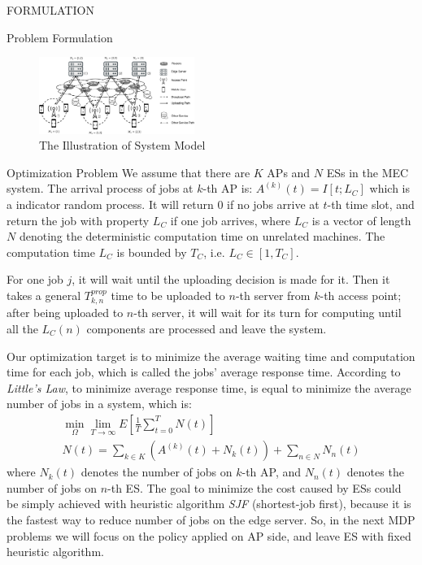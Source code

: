\documentclass[10pt, conference, letterpaper]{IEEEtran}
\begin{document}
\begin{section}{FORMULATION}
\begin{subsection}{Problem Formulation}
            \begin{figure}[h]
                \centering
                \includegraphics[width=0.45\textwidth, trim={0.5cm 0.5cm 0.5cm 0.5cm}, clip]{system-model.pdf}
                \caption{The Illustration of System Model}
                \label{fig:system}
            \end{figure}

            \begin{subsubsection}{Optimization Problem}
                We assume that there are $K$ APs and $N$ ESs in the MEC system.
                The arrival process of jobs at $k$-th AP is: $A^{(k)}(t)=I[t; L_C]$ which is a indicator random process. It will return $0$ if no jobs arrive at $t$-th time slot, and return the job with property $L_C$ if one job arrives, where $L_C$ is a vector of length $N$ denoting the deterministic computation time on unrelated machines.
                The computation time $L_C$ is bounded by $T_C$, i.e. $L_C \in [1,T_C]$.
                
                For one job $j$, it will wait until the uploading decision is made for it. Then it takes a general $T^{prop}_{k,n}$ time to be uploaded to $n$-th server from $k$-th access point; after being uploaded to $n$-th server, it will wait for its turn for computing until all the $L_C(n)$ components are processed and leave the system.
                
                Our optimization target is to minimize the average waiting time and computation time for each job, which is called the jobs' average response time. According to \emph{Little’s Law}, to minimize average response time, is equal to minimize the average number of jobs in a system, which is:
                \begin{gather}
                    \min_{\Omega} \lim_{T \to \infty} E[\frac{1}{T} \sum_{t=0}^{T} N(t)]
                    \\
                    N(t) = \sum_{k \in K} (A^{(k)}(t) + N_k(t))
                            + \sum_{n \in N} N_n(t)
                \end{gather}
                where $N_k(t)$ denotes the number of jobs on $k$-th AP, and $N_n(t)$ denotes the number of jobs on $n$-th ES.
                The goal to minimize the cost caused by ESs could be simply achieved with heuristic algorithm \emph{SJF} (shortest-job first), because it is the fastest way to reduce number of jobs on the edge server. So, in the next MDP problems we will focus on the policy applied on AP side, and leave ES with fixed heuristic algorithm.
            \end{subsubsection}


\end{subsection}
\end{section}
\end{document}
